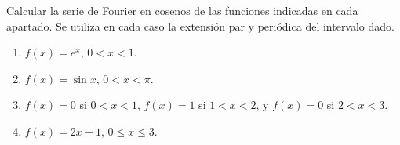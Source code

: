 Calcular la serie de Fourier en cosenos de las funciones indicadas en cada apartado.
Se utiliza en cada caso la extensión par y periódica del intervalo dado.

\begin{enumerate}[label=(\alph*),ref=\alph*,leftmargin=*]
\item \(f(x)=e^x\), \(0<x<1\).
\item \(f(x)=\sin x\), \(0<x<\pi\).
\item \(f(x)=0\) si \(0<x<1\), \(f(x)=1\) si \(1<x<2\), y \(f(x)=0\) si \(2<x<3\).
\item \(f(x)=2x+1\), \(0\le x\le3\).
\end{enumerate}

